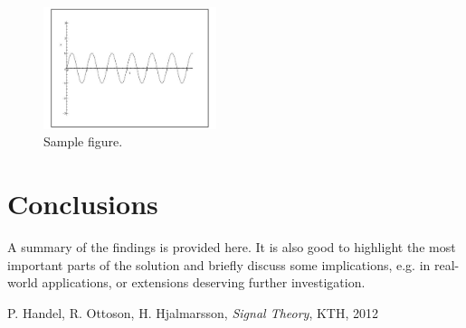 \documentclass[twocolumn, 12pt]{IEEEtran}
\begin{document}
\begin{figure}[t]
\begin{center}
\includegraphics[trim=1.8cm 5.1cm 2.8cm 4.9cm, clip=true, totalheight=0.2\textheight,width=0.45\textwidth]{Sinusoid.pdf}
\end{center}
\vspace{-0.4cm}
\caption {Sample figure.}
\label{fig:Fig1}
\end{figure}
\section{Conclusions}
A summary of the findings is provided here. It is also good to highlight the most important 
parts of the solution and briefly discuss some implications, e.g. in real-world applications,
or extensions deserving further investigation.

\begin{thebibliography}{1}

P. Handel, R. Ottoson, H. Hjalmarsson, \emph{Signal Theory}, KTH, 2012

\end{thebibliography}

\balance
\end{document}
